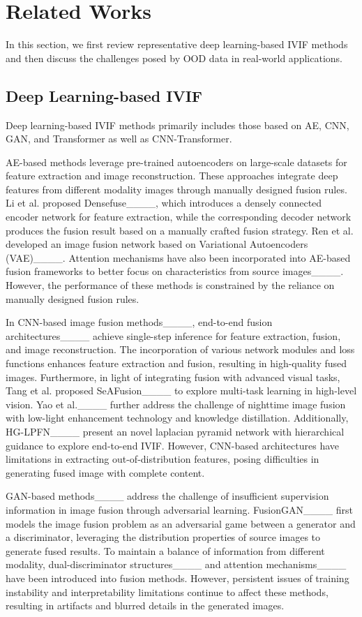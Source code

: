 \section{Related Works}
In this section, we first review representative deep learning-based IVIF methods and then discuss the challenges posed by OOD data in real-world applications.

\subsection{Deep Learning-based IVIF}
Deep learning-based IVIF methods primarily includes those based on AE, CNN, GAN, and Transformer as well as CNN-Transformer.

AE-based methods leverage pre-trained autoencoders on large-scale datasets for feature extraction and image reconstruction. These approaches integrate deep features from different modality images through manually designed fusion rules. Li et al. proposed Densefuse____, which introduces a densely connected encoder network for feature extraction, while the corresponding decoder network produces the fusion result based on a manually crafted fusion strategy. Ren et al. developed an image fusion network based on Variational Autoencoders (VAE)____. Attention mechanisms have also been incorporated into AE-based fusion frameworks to better focus on characteristics from source images____. However, the performance of these methods is constrained by the reliance on manually designed fusion rules.

In CNN-based image fusion methods____, end-to-end fusion architectures____ achieve single-step inference for feature extraction, fusion, and image reconstruction. The incorporation of various network modules and loss functions enhances feature extraction and fusion, resulting in high-quality fused images. Furthermore, in light of integrating fusion with advanced visual tasks, Tang et al. proposed SeAFusion____ to explore multi-task learning in high-level vision. Yao et al.____ further address the challenge of nighttime image fusion with low-light enhancement technology and knowledge distillation. Additionally, HG-LPFN____ present an novel laplacian pyramid network with hierarchical guidance to explore end-to-end IVIF. However, CNN-based architectures have limitations in extracting out-of-distribution features, posing difficulties in generating fused image with complete content.

GAN-based methods____ address the challenge of insufficient supervision information in image fusion through adversarial learning. FusionGAN____ first models the image fusion problem as an adversarial game between a generator and a discriminator, leveraging the distribution properties of source images to generate fused results. To maintain a balance of information from different modality, dual-discriminator structures____ and attention mechanisms____ have been introduced into fusion methods. However, persistent issues of training instability and interpretability limitations continue to affect these methods, resulting in artifacts and blurred details in the generated images.

